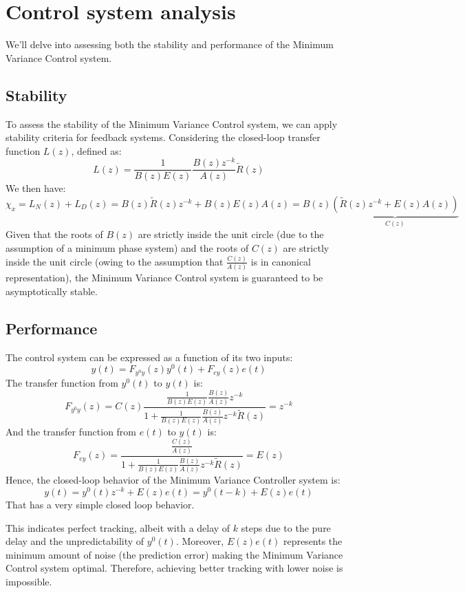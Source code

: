 \section{Control system analysis}

We'll delve into assessing both the stability and performance of the Minimum Variance Control system.

\subsection{Stability}
To assess the stability of the Minimum Variance Control system, we can apply stability criteria for feedback systems. 
Considering the closed-loop transfer function $L(z)$, defined as:
\[L(z)=\dfrac{1}{B(z)E(z)}\dfrac{B(z)z^{-k}}{A(z)}\tilde{R}(z)\]
We then have:
\[\chi_x=L_N(z)+L_D(z)=B(z)\tilde{R}(z)z^{-k}+B(z)E(z)A(z)=B(z)\underbrace{\left(\tilde{R}(z)z^{-k}+E(z)A(z)\right)}_{C(z)}\]
Given that the roots of  $B(z)$ are strictly inside the unit circle (due to the assumption of a minimum phase system) and the roots of $C(z)$ are strictly inside the unit circle (owing to the assumption that $\frac{C(z)}{A(z)}$ is in canonical representation), the Minimum Variance Control system is guaranteed to be asymptotically stable.

\subsection{Performance}
The control system can be expressed as a function of its two inputs:
\[y(t)=F_{y^{0} y}(z)y^{0}(t)+F_{ey}(z)e(t)\]
The transfer function from $y^{0}(t)$ to $y(t)$ is: 
\[F_{y^{0} y}(z)=C(z)\dfrac{\frac{1}{B(z)E(z)}\frac{B(z)}{A(z)}z^{-k}}{1+\frac{1}{B(z)E(z)}\frac{B(z)}{A(z)}z^{-k}\tilde{R}(z)}=z^{-k}\]
And the transfer function from $e(t)$ to $y(t)$ is: 
\[F_{ey}(z)=\dfrac{\frac{C(z)}{A(z)}}{1+\frac{1}{B(z)E(z)}\frac{B(z)}{A(z)}z^{-k}\tilde{R}(z)}=E(z)\]
Hence, the closed-loop behavior of the Minimum Variance Controller system is:
\[y(t)=y^{0}(t)z^{-k}+E(z)e(t)=y^{0}(t-k)+E(z)e(t)\]
That has a very simple closed loop behavior. 

This indicates perfect tracking, albeit with a delay of $k$ steps due to the pure delay and the unpredictability of $y^{0}(t)$. 
Moreover, $E(z)e(t)$ represents the minimum amount of noise (the prediction error) making the Minimum Variance Control system optimal.
Therefore, achieving better tracking with lower noise is impossible.